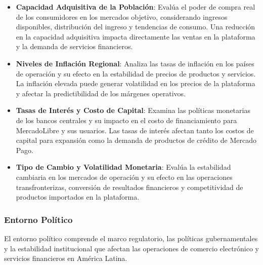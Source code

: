 \begin{itemize}
\item \textbf{Capacidad Adquisitiva de la Población}: Evalúa el poder de compra real de los consumidores en los mercados objetivo, considerando ingresos disponibles, distribución del ingreso y tendencias de consumo. Una reducción en la capacidad adquisitiva impacta directamente las ventas en la plataforma y la demanda de servicios financieros.

\item \textbf{Niveles de Inflación Regional}: Analiza las tasas de inflación en los países de operación y su efecto en la estabilidad de precios de productos y servicios. La inflación elevada puede generar volatilidad en los precios de la plataforma y afectar la predictibilidad de los márgenes operativos.

\item \textbf{Tasas de Interés y Costo de Capital}: Examina las políticas monetarias de los bancos centrales y su impacto en el costo de financiamiento para MercadoLibre y sus usuarios. Las tasas de interés afectan tanto los costos de capital para expansión como la demanda de productos de crédito de Mercado Pago.

\item \textbf{Tipo de Cambio y Volatilidad Monetaria}: Evalúa la estabilidad cambiaria en los mercados de operación y su efecto en las operaciones transfronterizas, conversión de resultados financieros y competitividad de productos importados en la plataforma.
\end{itemize}

\subsubsection{Entorno Político}

El entorno político comprende el marco regulatorio, las políticas gubernamentales y la estabilidad institucional que afectan las operaciones de comercio electrónico y servicios financieros en América Latina.

